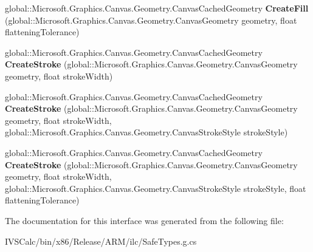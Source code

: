 \begin{DoxyCompactItemize}
global\+::\+Microsoft.\+Graphics.\+Canvas.\+Geometry.\+Canvas\+Cached\+Geometry {\bfseries Create\+Fill} (global\+::\+Microsoft.\+Graphics.\+Canvas.\+Geometry.\+Canvas\+Geometry geometry, float flattening\+Tolerance)
\item 
\mbox{\label{interface_microsoft_1_1_graphics_1_1_canvas_1_1_geometry_1_1_i_canvas_cached_geometry_statics_a979cdeceea3a10a40d02ca0440985082}} 
global\+::\+Microsoft.\+Graphics.\+Canvas.\+Geometry.\+Canvas\+Cached\+Geometry {\bfseries Create\+Stroke} (global\+::\+Microsoft.\+Graphics.\+Canvas.\+Geometry.\+Canvas\+Geometry geometry, float stroke\+Width)
\item 
\mbox{\label{interface_microsoft_1_1_graphics_1_1_canvas_1_1_geometry_1_1_i_canvas_cached_geometry_statics_a468aa4e2b6369a93bc595faa4775ecd3}} 
global\+::\+Microsoft.\+Graphics.\+Canvas.\+Geometry.\+Canvas\+Cached\+Geometry {\bfseries Create\+Stroke} (global\+::\+Microsoft.\+Graphics.\+Canvas.\+Geometry.\+Canvas\+Geometry geometry, float stroke\+Width, global\+::\+Microsoft.\+Graphics.\+Canvas.\+Geometry.\+Canvas\+Stroke\+Style stroke\+Style)
\item 
\mbox{\label{interface_microsoft_1_1_graphics_1_1_canvas_1_1_geometry_1_1_i_canvas_cached_geometry_statics_af2be06fab26ecb06f7f43abc6c9f7a87}} 
global\+::\+Microsoft.\+Graphics.\+Canvas.\+Geometry.\+Canvas\+Cached\+Geometry {\bfseries Create\+Stroke} (global\+::\+Microsoft.\+Graphics.\+Canvas.\+Geometry.\+Canvas\+Geometry geometry, float stroke\+Width, global\+::\+Microsoft.\+Graphics.\+Canvas.\+Geometry.\+Canvas\+Stroke\+Style stroke\+Style, float flattening\+Tolerance)
\end{DoxyCompactItemize}


The documentation for this interface was generated from the following file\+:\begin{DoxyCompactItemize}
\item 
I\+V\+S\+Calc/bin/x86/\+Release/\+A\+R\+M/ilc/Safe\+Types.\+g.\+cs\end{DoxyCompactItemize}
